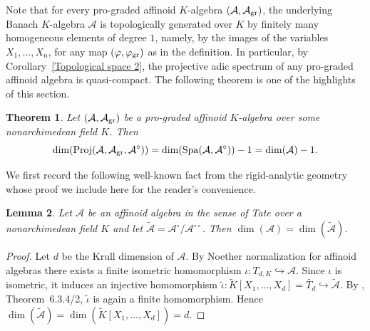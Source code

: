 \documentclass[12pt,twoside,a4paper]{article}
\newtheorem{thm}{Theorem}[section]
\newtheorem{lemma}[thm]{Lemma}
\theoremstyle{definition}
\theoremstyle{remark}
\newcommand\gr{{\rm gr}}
\newcommand\Proj{{\rm Proj}}
\newcommand\Spa{{\rm Spa}}
\begin{document}
Note that for every pro-graded affinoid $K$-algebra $(\mathcal{A}, \mathcal{A}_{\gr})$, the underlying Banach $K$-algebra $\mathcal{A}$ is topologically generated over $K$ by finitely many homogeneous elements of degree $1$, namely, by the images of the variables $X_1,\dots, X_n$, for any map $(\varphi, \varphi_{\gr})$ as in the definition. In particular, by Corollary~\ref{Topological space 2}, the projective adic spectrum of any pro-graded affinoid algebra is quasi-compact. The following theorem is one of the highlights of this section.
\begin{thm}\label{Dimension theorem}Let $(\mathcal{A}, \mathcal{A}_{\gr})$ be a pro-graded affinoid $K$-algebra over some nonarchimedean field $K$. Then \begin{equation*}\dim(\Proj(\mathcal{A}, \mathcal{A}_{\gr}, \mathcal{A}^{\circ}))=\dim(\Spa(\mathcal{A}, \mathcal{A}^{\circ}))-1=\dim(\mathcal{A})-1.\end{equation*}\end{thm}
We first record the following well-known fact from the rigid-analytic geometry whose proof we include here for the reader's convenience. 
\begin{lemma}\label{Krull dimension of affinoid algebras}Let $\mathcal{A}$ be an affinoid algebra in the sense of Tate over a nonarchimedean field $K$ and let $\widetilde{\mathcal{A}}=\mathcal{A}^{\circ}/\mathcal{A}^{\circ\circ}$. Then $\dim(\mathcal{A})=\dim(\widetilde{\mathcal{A}})$.\end{lemma}
\begin{proof}Let $d$ be the Krull dimension of $\mathcal{A}$. By Noether normalization for affinoid algebras there exists a finite isometric homomorphism $\iota: T_{d, K} \hookrightarrow \mathcal{A}$. Since $\iota$ is isometric, it induces an injective homomorphism $\widetilde{\iota}: \widetilde{K}[X_{1}, \dots, X_{d}]=\widetilde{T_{d}}\hookrightarrow \widetilde{\mathcal{A}}$. By \cite{BGR}, Theorem~6.3.4/2, $\widetilde{\iota}$ is again a finite homomorphism. Hence $\dim(\widetilde{\mathcal{A}})=\dim(\widetilde{K}[X_{1}, \dots, X_{d}])=d$.\end{proof}
\end{document}
